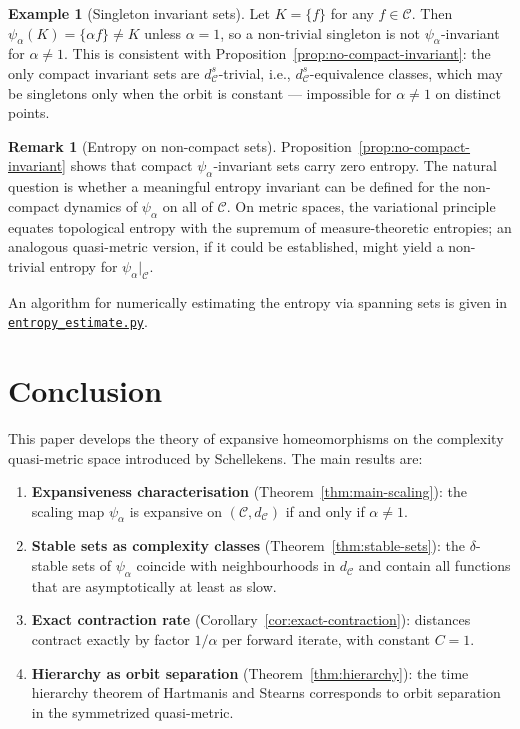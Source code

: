 \documentclass[11pt,a4paper]{article}
\newcommand{\repourl}{https://github.com/gabayae/expansive-homeomorphisms-complexity-qmetric}
\theoremstyle{plain}
\theoremstyle{definition}
\newtheorem{exampleinner}[theoreminner]{Example}
\newtheorem{remarkinner}[theoreminner]{Remark}
\newenvironment{example}[1][]{\begin{exampleinner}[#1]}{\end{exampleinner}}
\newenvironment{remark}[1][]{\begin{remarkinner}[#1]}{\end{remarkinner}}
\newcommand{\C}{\mathcal{C}}
\begin{document}
\begin{example}[Singleton invariant sets]\label{ex:entropy-zero}
Let $K=\{f\}$ for any $f\in\C$.  Then $\psi_\alpha(K)=\{\alpha f\}\ne K$
unless $\alpha=1$, so a non-trivial singleton is not
$\psi_\alpha$-invariant for $\alpha\ne 1$.  This is consistent with
Proposition~\ref{prop:no-compact-invariant}: the only compact
invariant sets are $d_\C^s$-trivial, i.e., $d_\C^s$-equivalence
classes, which may be singletons only when the orbit is constant ---
impossible for $\alpha\ne 1$ on distinct points.
\end{example}

\begin{remark}[Entropy on non-compact sets]\label{rem:entropy-gap}
Proposition~\ref{prop:no-compact-invariant} shows that compact
$\psi_\alpha$-invariant sets carry zero entropy.  The natural
question is whether a meaningful entropy invariant can be defined
for the non-compact dynamics of $\psi_\alpha$ on all of $\C$.  On
metric spaces, the variational principle equates topological entropy
with the supremum of measure-theoretic entropies; an analogous
quasi-metric version, if it could be established, might yield a
non-trivial entropy for $\psi_\alpha|_\C$.
\end{remark}

An algorithm for numerically estimating the entropy via spanning
sets is given in
\href{\repourl/blob/main/code/python/entropy_estimate.py}{\texttt{entropy\_estimate.py}}.


\section{Conclusion}
\label{sec:conclusion}

This paper develops the theory of expansive homeomorphisms on
the complexity quasi-metric space introduced by Schellekens.  The
main results are:

\begin{enumerate}[leftmargin=2em]
  \item \textbf{Expansiveness characterisation}
    (Theorem~\ref{thm:main-scaling}): the scaling map $\psi_\alpha$
    is expansive on $(\C,d_\C)$ if and only if $\alpha\neq 1$.
  \item \textbf{Stable sets as complexity classes}
    (Theorem~\ref{thm:stable-sets}): the $\delta$-stable sets of
    $\psi_\alpha$ coincide with neighbourhoods in $d_\C$ and contain
    all functions that are asymptotically at least as slow.
  \item \textbf{Exact contraction rate} (Corollary~\ref{cor:exact-contraction}):
    distances contract exactly by factor $1/\alpha$ per forward
    iterate, with constant $C=1$.
  \item \textbf{Hierarchy as orbit separation}
    (Theorem~\ref{thm:hierarchy}): the time hierarchy theorem of
    Hartmanis and Stearns corresponds to orbit separation in the
    symmetrized quasi-metric.
\end{enumerate}
\end{document}
